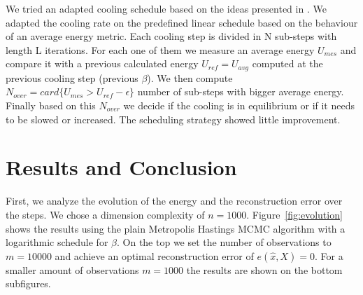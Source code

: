 \documentclass{scrartcl}
\begin{document}
We tried an adapted cooling schedule based on the ideas presented in \cite{1}. We adapted the cooling rate on the predefined linear schedule based on the behaviour of an average energy metric. Each cooling step is divided in N sub-steps with length L iterations. For each one of them we measure an average energy $U_{mes}$ and compare it with a previous calculated energy $U_{ref} = U_{avg}$ computed at the previous cooling step (previous $\beta$). We then compute $N_{over} = card\{ U_{mes} > U_{ref} - \epsilon\}$ number of sub-steps with bigger average energy.
Finally based on this $N_{over}$ we decide if the cooling is in equilibrium or if it needs to be slowed or increased. The scheduling strategy showed little improvement.

\section{Results and Conclusion}

First, we analyze the evolution of the energy and the reconstruction error over the steps. We chose a dimension complexity of $n=1000$. Figure~\ref{fig:evolution} shows the results using the plain Metropolis Hastings MCMC algorithm with a logarithmic schedule for $\beta$. On the top we set the number of observations to $m=10000$ and achieve an optimal reconstruction error of $e(\hat{x}, X) = 0$. For a smaller amount of observations $m=1000$ the results are shown on the bottom subfigures.
\end{document}
